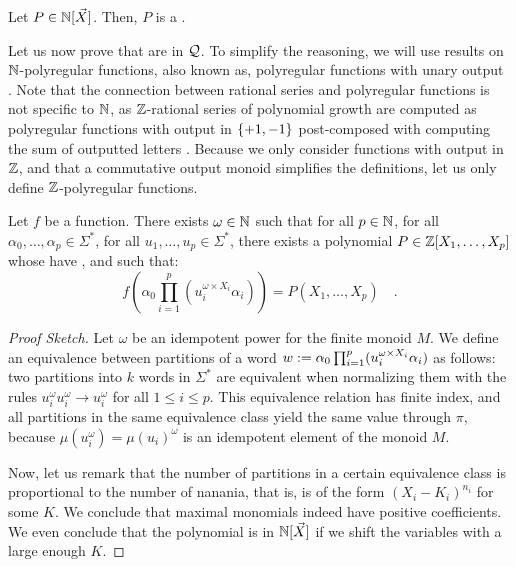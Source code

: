 \documentclass[a4paper,11pt]{article}
\begin{document}
\begin{fact}
    \label{fact:n-poly-n-poly}
    Let $P \in \mathbb{N}[\vec{X}]$. Then, $P$
    is a .
\end{fact}

Let us now prove that  are in $\mathcal{Q}$.
To simplify the reasoning, we will use results on $\mathbb{N}$-polyregular functions,
also known as, polyregular functions with unary output
\cite{doueneau2021pebble,bojanczyk2019string}. Note that the connection between
rational series and polyregular functions is not specific to $\mathbb{N}$, as
$\mathbb{Z}$-rational series of polynomial growth are computed as polyregular
functions with output in $\mathopen{\{} +1,-1 \mathclose{\}}$ post-composed with computing the sum of
outputted letters \cite{LOPEZ23b}. Because we only consider functions with
output in $\mathbb{Z}$, and that a commutative output monoid simplifies the definitions,
let us only define $\mathbb{Z}$-polyregular functions.


\begin{lemma}
    \label{n-poly-combinatorics:lem}
    Let $f$ be a   function. 
    There exists $\omega \in \mathbb{N}$
    such that for all $p \in \mathbb{N}$,
    for all $\alpha_0, \dots, \alpha_p \in \Sigma^*$,
    for all $u_1, \dots, u_p \in \Sigma^*$,
    there exists a polynomial $P \in \mathbb{Z}[X_1, \dots, X_p]$
    whose  have ,
    and such that:
    \begin{equation*}
        f(\alpha_0 \prod_{i = 1}^p (u_i^{\omega \times X_i} \alpha_i))
        = P(X_1, \dots, X_p) \quad .
    \end{equation*}
\end{lemma}
\begin{proof}[Proof Sketch]
    Let $\omega$ be an idempotent power for the finite monoid $M$.
    We define an equivalence between partitions of a word 
    $w \mathrel{:=} \alpha_0 \prod_{i = 1}^p (u_i^{\omega \times X_i} \alpha_i)$
    as follows: two partitions into $k$ words in $\Sigma^*$ are equivalent
    when normalizing them with the rules
    $u_i^{\omega} u_i^{\omega} \to u_i^{\omega}$ for all $1 \leq i \leq p$.
    This equivalence relation has finite index, and all partitions in the same
    equivalence class yield the same value through $\pi$, because
    $\mu(u_i^\omega) = \mu(u_i)^\omega$ is an idempotent element of the monoid $M$.

    Now, let us remark that the number of partitions
    in a certain equivalence class is proportional to
    the number of nanania, that is, is of the form
    $(X_i - K_i)^{n_i}$ for some $K$. We conclude that
    maximal monomials indeed have positive coefficients.
    We even conclude that
    the polynomial is in $\mathbb{N}[\vec{X}]$
    if we shift the variables with a large enough $K$. 
\end{proof}
\end{document}
